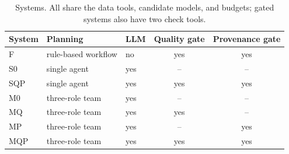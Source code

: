 \documentclass[conference]{IEEEtran}
\newcommand{\sys}[1]{\textsf{#1}}
\begin{document}
\begin{table}[t]
\caption{Systems. All share the data tools, candidate models, and budgets; gated systems also have two check tools.}
\label{tab:systems}
\centering\footnotesize\setlength{\tabcolsep}{5pt}
\begin{tabular}{@{}lllcc@{}}
\toprule
System & Planning & LLM & Quality gate & Provenance gate \\
\midrule
\sys{F}   & rule-based workflow & no  & yes & yes \\
\sys{S0}  & single agent        & yes & --  & -- \\
\sys{SQP} & single agent        & yes & yes & yes \\
\sys{M0}  & three-role team     & yes & --  & -- \\
\sys{MQ}  & three-role team     & yes & yes & -- \\
\sys{MP}  & three-role team     & yes & --  & yes \\
\sys{MQP} & three-role team     & yes & yes & yes \\
\bottomrule
\end{tabular}
\end{table}
\end{document}
